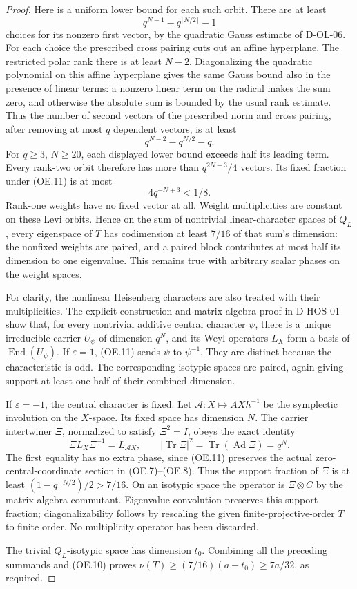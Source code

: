 \begin{proof}
Here is a uniform lower bound for each such orbit.  There are
at least
\[
                    q^{N-1}-q^{\lceil N/2\rceil}-1
\]
choices for its nonzero first vector, by the quadratic Gauss
estimate of D-OL-06.  For each choice the prescribed cross
pairing cuts out an affine hyperplane.  The restricted polar
rank there is at least $N-2$.  Diagonalizing the quadratic
polynomial on this affine hyperplane gives the same Gauss bound
also in the presence of linear terms: a nonzero linear term on
the radical makes the sum zero, and otherwise the absolute sum
is bounded by the usual rank estimate.  Thus the number of
second vectors of the prescribed norm and cross pairing,
after removing at most $q$ dependent vectors, is at least
\[
                    q^{N-2}-q^{N/2}-q.
\]
For $q\ge3$, $N\ge20$, each displayed lower bound exceeds
half its leading term.  Every rank-two orbit therefore has
more than $q^{2N-3}/4$ vectors.  Its fixed fraction under
(OE.11) is at most
\[
                        4q^{-N+3}<1/8.
                        \tag{OE.12}
\]
Rank-one weights have no fixed vector at all.  Weight
multiplicities are constant on these Levi orbits.  Hence on
the sum of nontrivial linear-character spaces of $Q_L$, every
eigenspace of $T$ has codimension at least $7/16$ of that
sum's dimension: the nonfixed weights are paired, and a
paired block contributes at most half its dimension to one
eigenvalue.  This remains true with arbitrary scalar phases
on the weight spaces.

For clarity, the nonlinear Heisenberg characters are also
treated with their multiplicities.  The explicit construction
and matrix-algebra proof in D-HOS-01 show that, for every
nontrivial additive central character $\psi$, there is a unique
irreducible carrier $U_\psi$ of dimension $q^N$, and its Weyl
operators $L_X$ form a basis of $\operatorname{End}(U_\psi)$.
If $\varepsilon=1$, (OE.11) sends $\psi$ to $\psi^{-1}$.
They are distinct because the characteristic is odd.  The
corresponding isotypic spaces are paired, again giving support
at least one half of their combined dimension.

If $\varepsilon=-1$, the central character is fixed.  Let
$\mathcal A:X\mapsto AXh^{-1}$ be the symplectic involution
on the $X$-space.  Its fixed space has dimension $N$.  The
carrier intertwiner $\Xi$, normalized to satisfy $\Xi^2=I$,
obeys the exact identity
\[
 \Xi L_X\Xi^{-1}=L_{\mathcal A X},\qquad
 |\operatorname{Tr}\Xi|^2
       =\operatorname{Tr}(\operatorname{Ad}\Xi)
       =q^N.
 \tag{OE.13}
\]
The first equality has no extra phase, since (OE.11) preserves
the actual zero-central-coordinate section in (OE.7)--(OE.8).
Thus the support fraction of $\Xi$ is at least
$(1-q^{-N/2})/2>7/16$.  On an isotypic space the operator is
$\Xi\otimes C$ by the matrix-algebra commutant.  Eigenvalue
convolution preserves this support fraction; diagonalizability
follows by rescaling the given finite-projective-order $T$ to
finite order.  No multiplicity operator has been discarded.

The trivial $Q_L$-isotypic space has dimension $t_0$.  Combining
all the preceding summands and (OE.10) proves
$\nu(T)\ge(7/16)(a-t_0)\ge7a/32$, as required.
\end{proof}

